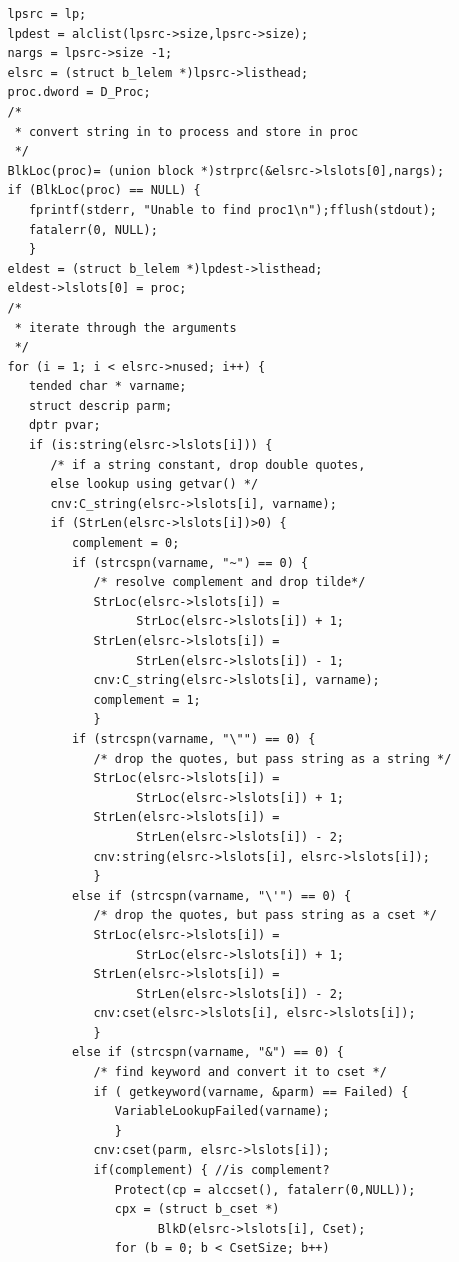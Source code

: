 \documentclass{article}
\begin{document}
\begin{verbatim}
   lpsrc = lp;
   lpdest = alclist(lpsrc->size,lpsrc->size);
   nargs = lpsrc->size -1;
   elsrc = (struct b_lelem *)lpsrc->listhead;
   proc.dword = D_Proc;
   /* 
    * convert string in to process and store in proc
    */
   BlkLoc(proc)= (union block *)strprc(&elsrc->lslots[0],nargs);
   if (BlkLoc(proc) == NULL) {
      fprintf(stderr, "Unable to find proc1\n");fflush(stdout);
      fatalerr(0, NULL);
      }
   eldest = (struct b_lelem *)lpdest->listhead;
   eldest->lslots[0] = proc;
   /* 
    * iterate through the arguments
    */
   for (i = 1; i < elsrc->nused; i++) {
      tended char * varname;
      struct descrip parm;
      dptr pvar;
      if (is:string(elsrc->lslots[i])) {
         /* if a string constant, drop double quotes,
         else lookup using getvar() */
         cnv:C_string(elsrc->lslots[i], varname);
         if (StrLen(elsrc->lslots[i])>0) {
            complement = 0;
            if (strcspn(varname, "~") == 0) {
               /* resolve complement and drop tilde*/
               StrLoc(elsrc->lslots[i]) =
                     StrLoc(elsrc->lslots[i]) + 1;
               StrLen(elsrc->lslots[i]) = 
                     StrLen(elsrc->lslots[i]) - 1;
               cnv:C_string(elsrc->lslots[i], varname);
               complement = 1;
               }
            if (strcspn(varname, "\"") == 0) {
               /* drop the quotes, but pass string as a string */
               StrLoc(elsrc->lslots[i]) = 
                     StrLoc(elsrc->lslots[i]) + 1;
               StrLen(elsrc->lslots[i]) = 
                     StrLen(elsrc->lslots[i]) - 2;
               cnv:string(elsrc->lslots[i], elsrc->lslots[i]);
               }
            else if (strcspn(varname, "\'") == 0) { 
               /* drop the quotes, but pass string as a cset */
               StrLoc(elsrc->lslots[i]) = 
                     StrLoc(elsrc->lslots[i]) + 1;
               StrLen(elsrc->lslots[i]) = 
                     StrLen(elsrc->lslots[i]) - 2;
               cnv:cset(elsrc->lslots[i], elsrc->lslots[i]);
               }
            else if (strcspn(varname, "&") == 0) {
               /* find keyword and convert it to cset */
               if ( getkeyword(varname, &parm) == Failed) {
                  VariableLookupFailed(varname);
                  }
               cnv:cset(parm, elsrc->lslots[i]);
               if(complement) { //is complement?
                  Protect(cp = alccset(), fatalerr(0,NULL));
                  cpx = (struct b_cset *)
                        BlkD(elsrc->lslots[i], Cset);
                  for (b = 0; b < CsetSize; b++) 

\end{verbatim}
\end{document}
